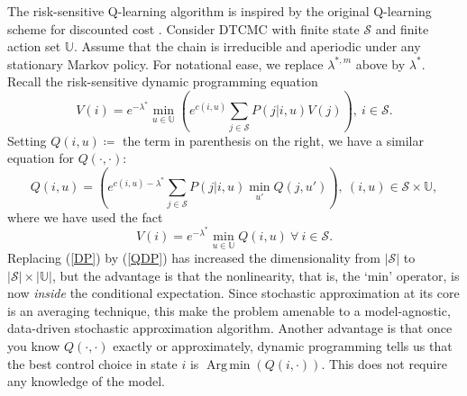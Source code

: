 \documentclass[notitlepage,11pt,reqno]{amsart}
\numberwithin{equation}{section}
\theoremstyle{plain}
\theoremstyle{definition}
\theoremstyle{remark}
\newcommand{\Act}{{\mathds{U}}}
\newcommand{\cS}{{\mathcal{S}}}     %
\DeclareMathOperator*{\Argmin}{Arg\,min}
\newcommand{\df}{\coloneqq}
\begin{document}
The risk-sensitive Q-learning algorithm is inspired by the original Q-learning scheme for discounted cost \cite{Watkins}.
Consider DTCMC with finite state $\cS$ and finite action set $\Act$. Assume that the chain is irreducible and aperiodic under any stationary Markov policy. For notational ease, we replace $\lambda^{*,m}$ above by $\lambda^*$. Recall the risk-sensitive dynamic programming equation
\begin{equation}\label{DP}
V(i) = e^{-\lambda^*}\min_{u\in\Act}\left(e^{c(i,u)}\sum_{j\in\cS} P(j|i,u)V(j)\right), \ i\in\cS. 
\end{equation}
Setting $Q(i,u)\df$ the term in parenthesis on the right, we have a similar equation for $Q(\cdot,\cdot)$:
\begin{equation}\label{QDP}
Q(i,u) = \left(e^{c(i,u)-\lambda^*}\sum_{j\in\cS}P(j|i,u)\min_{u'}Q(j,u')\right), \ (i,u)\in\cS\times\Act, 
\end{equation}
where we have used the fact 
\begin{equation}\label{V-Q}
V(i) = e^{-\lambda^*}\min_{u\in\Act} Q(i,u) \ \forall \ i\in\cS.
\end{equation}
Replacing (\ref{DP}) by (\ref{QDP}) has increased the dimensionality from 
$|\cS|$ to $|\cS|\times|\Act|$, but the advantage is that the nonlinearity, that is, the `min' operator, is now \textit{inside} the conditional expectation. Since stochastic approximation  at its core is an averaging technique, this make the problem amenable to a model-agnostic, data-driven stochastic approximation algorithm.
Another advantage is that once you know $Q(\cdot,\cdot)$ exactly or approximately, dynamic programming tells us that the best control choice in state $i$ is $\Argmin(Q(i, \cdot))$. This does not require any knowledge of the model.
\end{document}
